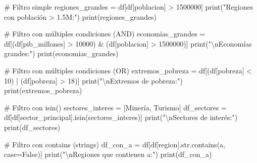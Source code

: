 \documentclass[
  doc,
  floatsintext,
  longtable,
  a4paper,
  nolmodern,
  notxfonts,
  notimes,
  12pt,
  colorlinks=true,linkcolor=blue,citecolor=blue,urlcolor=blue]{apa7}
\newenvironment{Shaded}{\begin{snugshade}}{\end{snugshade}}
\newcommand{\BuiltInTok}[1]{\textcolor[rgb]{0.00,0.23,0.31}{#1}}
\newcommand{\CharTok}[1]{\textcolor[rgb]{0.13,0.47,0.30}{#1}}
\newcommand{\CommentTok}[1]{\textcolor[rgb]{0.37,0.37,0.37}{#1}}
\newcommand{\DecValTok}[1]{\textcolor[rgb]{0.68,0.00,0.00}{#1}}
\newcommand{\NormalTok}[1]{\textcolor[rgb]{0.00,0.23,0.31}{#1}}
\newcommand{\OperatorTok}[1]{\textcolor[rgb]{0.37,0.37,0.37}{#1}}
\newcommand{\StringTok}[1]{\textcolor[rgb]{0.13,0.47,0.30}{#1}}
\newcommand{\VariableTok}[1]{\textcolor[rgb]{0.07,0.07,0.07}{#1}}
\begin{document}
\begin{Shaded}
\begin{Highlighting}[]
\CommentTok{\# Filtro simple}
\NormalTok{regiones\_grandes }\OperatorTok{=}\NormalTok{ df[df[}\StringTok{\textquotesingle{}poblacion\textquotesingle{}}\NormalTok{] }\OperatorTok{\textgreater{}} \DecValTok{1500000}\NormalTok{]}
\BuiltInTok{print}\NormalTok{(}\StringTok{"Regiones con población \textgreater{} 1.5M:"}\NormalTok{)}
\BuiltInTok{print}\NormalTok{(regiones\_grandes)}

\CommentTok{\# Filtro con múltiples condiciones (AND)}
\NormalTok{economias\_grandes }\OperatorTok{=}\NormalTok{ df[(df[}\StringTok{\textquotesingle{}pib\_millones\textquotesingle{}}\NormalTok{] }\OperatorTok{\textgreater{}} \DecValTok{10000}\NormalTok{) }\OperatorTok{\&}\NormalTok{ (df[}\StringTok{\textquotesingle{}poblacion\textquotesingle{}}\NormalTok{] }\OperatorTok{\textgreater{}} \DecValTok{1500000}\NormalTok{)]}
\BuiltInTok{print}\NormalTok{(}\StringTok{"}\CharTok{\textbackslash{}n}\StringTok{Economías grandes:"}\NormalTok{)}
\BuiltInTok{print}\NormalTok{(economias\_grandes)}

\CommentTok{\# Filtro con múltiples condiciones (OR)}
\NormalTok{extremos\_pobreza }\OperatorTok{=}\NormalTok{ df[(df[}\StringTok{\textquotesingle{}pobreza\textquotesingle{}}\NormalTok{] }\OperatorTok{\textless{}} \DecValTok{10}\NormalTok{) }\OperatorTok{|}\NormalTok{ (df[}\StringTok{\textquotesingle{}pobreza\textquotesingle{}}\NormalTok{] }\OperatorTok{\textgreater{}} \DecValTok{18}\NormalTok{)]}
\BuiltInTok{print}\NormalTok{(}\StringTok{"}\CharTok{\textbackslash{}n}\StringTok{Extremos de pobreza:"}\NormalTok{)}
\BuiltInTok{print}\NormalTok{(extremos\_pobreza)}

\CommentTok{\# Filtro con isin()}
\NormalTok{sectores\_interes }\OperatorTok{=}\NormalTok{ [}\StringTok{\textquotesingle{}Minería\textquotesingle{}}\NormalTok{, }\StringTok{\textquotesingle{}Turismo\textquotesingle{}}\NormalTok{]}
\NormalTok{df\_sectores }\OperatorTok{=}\NormalTok{ df[df[}\StringTok{\textquotesingle{}sector\_principal\textquotesingle{}}\NormalTok{].isin(sectores\_interes)]}
\BuiltInTok{print}\NormalTok{(}\StringTok{"}\CharTok{\textbackslash{}n}\StringTok{Sectores de interés:"}\NormalTok{)}
\BuiltInTok{print}\NormalTok{(df\_sectores)}

\CommentTok{\# Filtro con contains (strings)}
\NormalTok{df\_con\_a }\OperatorTok{=}\NormalTok{ df[df[}\StringTok{\textquotesingle{}region\textquotesingle{}}\NormalTok{].}\BuiltInTok{str}\NormalTok{.contains(}\StringTok{\textquotesingle{}a\textquotesingle{}}\NormalTok{, case}\OperatorTok{=}\VariableTok{False}\NormalTok{)]}
\BuiltInTok{print}\NormalTok{(}\StringTok{"}\CharTok{\textbackslash{}n}\StringTok{Regiones que contienen \textquotesingle{}a\textquotesingle{}:"}\NormalTok{)}
\BuiltInTok{print}\NormalTok{(df\_con\_a)}


\end{Highlighting}
\end{Shaded}
\end{document}
